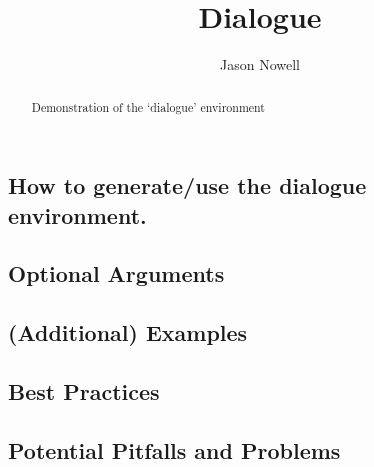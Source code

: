 \documentclass{ximera}
\title{Dialogue}
\author{Jason Nowell}
\begin{document}
\begin{abstract}
    Demonstration of the `dialogue' environment
\end{abstract}
\maketitle


    \subsection*{How to generate/use the dialogue environment.}
        
        
        
    \subsection*{Optional Arguments}
    
        
        
    \subsection*{(Additional) Examples}
        
        
        
    \subsection*{Best Practices}
    
        
        
    \subsection*{Potential Pitfalls and Problems}   
        
        
        
        
\end{document}
